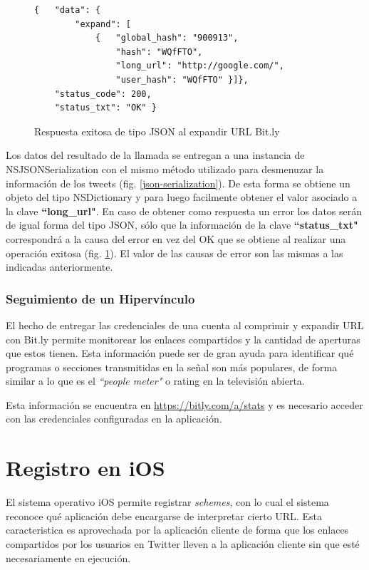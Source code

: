 \begin{figure}[H]
	\centering
\begin{lstlisting}
{   "data": {
        "expand": [
            { 	"global_hash": "900913",
                "hash": "WQfFTO",
                "long_url": "http://google.com/",
                "user_hash": "WQfFTO" }]},
    "status_code": 200,
    "status_txt": "OK" }
\end{lstlisting}
	\caption{Respuesta exitosa de tipo JSON al expandir URL Bit.ly}
	\label{bitly-json-response}
\end{figure}	
Los datos del resultado de la llamada se entregan a una instancia de NSJSONSerialization con el mismo método utilizado para desmenuzar la información de los tweets (fig. \ref{json-serialization}). De esta forma se obtiene un objeto del tipo NSDictionary y para luego facilmente obtener el valor asociado a la clave \textbf{\textquotedblleft long\_url"}.
En caso de obtener como respuesta un error los datos serán de igual forma del tipo JSON, sólo que la información de la clave \textbf{\textquotedblleft status\_txt"} correspondrá a la causa del error en vez del OK que se obtiene al realizar una operación exitosa (fig. \ref{bitly-json-response}). El valor de las causas de error son las mismas a las indicadas anteriormente.

		\subsubsection{Seguimiento de un Hipervínculo}		
El hecho de entregar las credenciales de una cuenta al comprimir y expandir URL con Bit.ly permite monitorear los enlaces compartidos y la cantidad de aperturas que estos tienen. Esta información puede ser de gran ayuda para identificar qué programas o secciones transmitidas en la señal son más populares, de forma similar a lo que es el \textit{\textquotedblleft people meter"} o rating en la televisión abierta.

Esta información se encuentra en \url{https://bitly.com/a/stats} y es necesario acceder con las credenciales configuradas en la aplicación.

\clearpage
\section{Registro en iOS}
El sistema operativo iOS permite registrar \textit{schemes}, con lo cual el sistema reconoce qué aplicación debe encargarse de interpretar cierto URL. Esta caracteristica es aprovechada por la aplicación cliente de forma que los enlaces compartidos por los usuarios en Twitter lleven a la aplicación cliente sin que esté necesariamente en ejecución.
